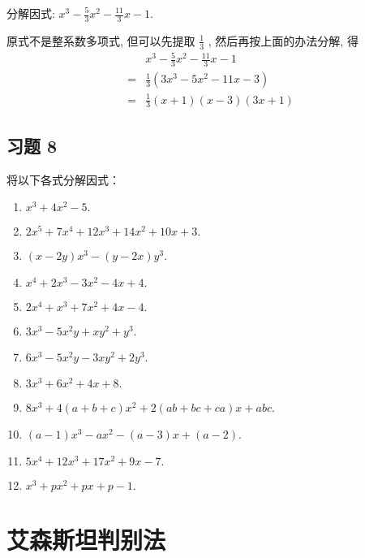 \begin{example}
	分解因式: $x^{3}-\frac{5}{3} x^{2}-\frac{11}{3} x-1$.
\end{example}
\begin{solution}
	原式不是整系数多项式, 但可以先提取 $\frac{1}{3}$ , 然后再按上面的办法分解, 得
	\begin{align*}
		  & x^{3}-\frac{5}{3} x^{2}-\frac{11}{3} x-1       \\
		= & \frac{1}{3}\left(3 x^{3}-5 x^{2}-11 x-3\right) \\
		= & \frac{1}{3}(x+1)(x-3)(3 x+1)
	\end{align*}
\end{solution}

\subsection*{习题 8}
将以下各式分解因式：
\begin{enumerate}
    \item $x^{3}+4 x^{2}-5.$
    \item $2 x^{5}+7 x^{4}+12 x^{3}+14 x^{2}+10 x+3.$
    \item $(x-2 y) x^{3}-(y-2 x) y^{3}.$
    \item $x^{4}+2 x^{3}-3 x^{2}-4 x+4.$
    \item $2 x^{4}+x^{3}+7 x^{2}+4 x-4.$
    \item $3 x^{3}-5 x^{2} y+x y^{2}+y^{3}.$
    \item $6 x^{3}-5 x^{2} y-3 x y^{2}+2 y^{3}.$
    \item $3 x^{3}+6 x^{2}+4 x+8.$
    \item $8 x^{3}+4(a+b+c) x^{2}+2(a b+b c+c a) x+a b c.$
    \item $(a-1) x^{3}-a x^{2}-(a-3) x+(a-2).$
    \item $5x^{4}+12 x^{3}+17 x^{2}+9 x-7.$
    \item $x^{3}+p x^{2}+p x+p-1.$
\end{enumerate}


\section{艾森斯坦判别法}

